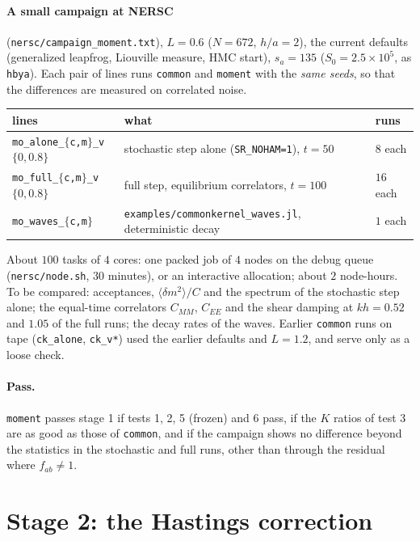 \documentclass[11pt,aps,preprint,nofootinbib,superscriptaddress,tightenlines]{revtex4-2}
\let\oldparagraph\paragraph
\renewcommand{\paragraph}{\par\bigskip\oldparagraph}
\begin{document}
\paragraph{A small campaign at NERSC} (\texttt{nersc/campaign\_moment.txt}), $L=0.6$ ($N=672$, $h/a=2$), the current defaults (generalized leapfrog,
Liouville measure, HMC start), $s_a=135$ ($S_0=2.5\times10^5$, as \texttt{hbya}).  Each pair of lines runs \texttt{common} and \texttt{moment} with the \emph{same seeds},
so that the differences are measured on correlated noise.
\begin{center}
\begin{tabular}{lll}
\hline
lines & what & runs \\ \hline
\texttt{mo\_alone\_}$\{$\texttt{c,m}$\}$\texttt{\_v}$\{0,0.8\}$ & stochastic step alone (\texttt{SR\_NOHAM=1}), $t=50$ & $8$ each \\
\texttt{mo\_full\_}$\{$\texttt{c,m}$\}$\texttt{\_v}$\{0,0.8\}$ & full step, equilibrium correlators, $t=100$ & $16$ each \\
\texttt{mo\_waves\_}$\{$\texttt{c,m}$\}$ & \texttt{examples/commonkernel\_waves.jl}, deterministic decay & $1$ each \\
\hline
\end{tabular}
\end{center}
About $100$ tasks of $4$ cores: one packed job of $4$ nodes on the debug queue (\texttt{nersc/node.sh}, $30$ minutes), or an interactive
allocation; about $2$ node-hours.  To be compared: acceptances, $\langle\delta m^2\rangle/C$ and the spectrum of the stochastic step alone; the
equal-time correlators $C_{MM}$, $C_{EE}$ and the shear damping at $kh=0.52$ and $1.05$ of the full runs; the decay rates of the waves.
Earlier \texttt{common} runs on tape (\texttt{ck\_alone}, \texttt{ck\_v*}) used the earlier defaults and $L=1.2$, and serve only as a loose check.

\paragraph{Pass.}  \texttt{moment} passes stage 1 if tests 1, 2, 5 (frozen) and 6 pass, if the $K$ ratios of test 3 are as good as those of \texttt{common},
and if the campaign shows no difference beyond the statistics in the stochastic and full runs, other than through the residual where
$f_{ab}\neq1$.


\section{Stage 2: the Hastings correction}
\label{sec:stage2}
\end{document}
